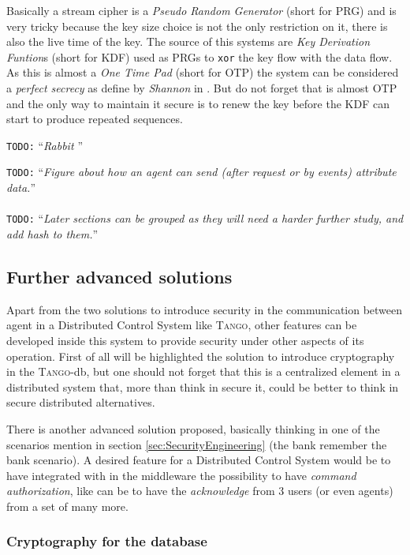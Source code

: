 \documentclass[10pt,a4paper,twoside]{llncs}
\newcommand{\todo}[1]{\texttt{\color{red}TODO:} ``\emph{#1}''}
\newcommand{\tango}{\textsc{Tango}}
\begin{document}
Basically a stream cipher is a \emph{Pseudo Random Generator} (short for PRG) and is very tricky because the key size choice is not the only restriction on it, there is also the live time of the key. The source of this systems are \emph{Key Derivation Funtion}s (short for KDF) used as PRGs to {\tt xor} the key flow with the data flow. As this is almost a \emph{One Time Pad} (short for OTP) the system can be considered a \emph{perfect secrecy} as define by \emph{Shannon} in \cite{shannon-comTheorySecSys}. But do not forget that is almost OTP and the only way to maintain it secure is to renew the key before the KDF can start to produce repeated sequences.

\todo{Rabbit \cite{rfc4503}}

\todo{Figure about how an agent can send (after request or by events) attribute data.}
\\\\
\todo{Later sections can be grouped as they will need a harder further study, and add hash to them.}

\subsection{Further advanced solutions}\label{sec:advancedSolutions}

Apart from the two solutions to introduce security in the communication between agent in a Distributed Control System like \tango, other features can be developed inside this system to provide security under other aspects of its operation. First of all will be highlighted the solution to introduce cryptography in the \tango-db, but one should not forget that this is a centralized element in a distributed system that, more than think in secure it, could be better to think in secure distributed alternatives.

There is another advanced solution proposed, basically thinking in one of the scenarios mention in section \ref{sec:SecurityEngineering} (the bank remember the bank scenario). A desired feature for a Distributed Control System would be to have integrated with in the middleware the possibility to have \emph{command authorization}, like can be to have the \emph{acknowledge} from 3 users (or even agents) from a set of many more.

\subsubsection{Cryptography for the database}\label{sec:Database}
\end{document}
